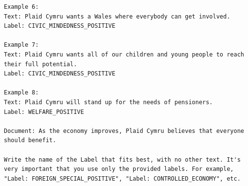 \documentclass[11pt]{article}
\begin{document}
\begin{listing*}[tp]
\begin{lstlisting}
Example 6:
Text: Plaid Cymru wants a Wales where everybody can get involved.
Label: CIVIC_MINDEDNESS_POSITIVE

Example 7:
Text: Plaid Cymru wants all of our children and young people to reach their full potential.
Label: CIVIC_MINDEDNESS_POSITIVE

Example 8:
Text: Plaid Cymru will stand up for the needs of pensioners.
Label: WELFARE_POSITIVE

Document: As the economy improves, Plaid Cymru believes that everyone should benefit.

Write the name of the Label that fits best, with no other text. It's very important that you use only the provided labels. For example, "Label: FOREIGN_SPECIAL_POSITIVE", "Label: CONTROLLED_ECONOMY", etc.
\end{lstlisting}
\caption{Global codebook+demo prompt (condition 5) for the first Manifesto development sentence, with $k{=}8$ examples and 30 category entries. The experimental wording is preserved except that the 30 category blocks are summarized between \texttt{<<} and \texttt{>>}, and long lines are wrapped. \texttt{[SYSTEM]} and \texttt{[USER]} identify messages formatted with each model's chat template. The eight examples appear in decreasing similarity order, selected from 5,711 training sentences. They contain six distinct labels; the reference label, \texttt{MARKET\_REGULATION}, appears once, at rank four. Mistral instead predicted \texttt{ECONOMIC\_GROWTH\_POSITIVE}, the label of the nearest example.}
\label{lst:prompt}
\end{listing*}
\end{document}
